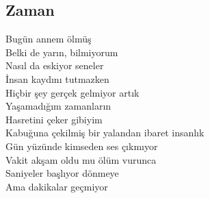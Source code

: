 \subsection{Zaman}

Bugün annem ölmüş \\
Belki de yarın, bilmiyorum \\
Nasıl da eskiyor seneler \\
İnsan kaydını tutmazken \\
Hiçbir şey gerçek gelmiyor artık \\
Yaşamadığım zamanların \\
Hasretini çeker gibiyim \\

\noindent\newline
Kabuğuna çekilmiş bir yalandan ibaret insanlık \\
Gün yüzünde kimseden ses çıkmıyor \\
Vakit akşam oldu mu ölüm vurunca \\
Saniyeler başlıyor dönmeye \\
Ama dakikalar geçmiyor \\
